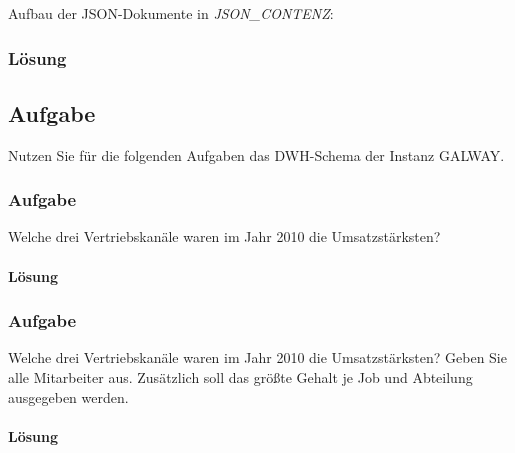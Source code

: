 Aufbau der JSON-Dokumente in \textit{JSON\_CONTENZ}:


\subsubsection*{Lösung}
\label{subsubsec:uebung_12.aufgabe_02.loesung}


\subsection{Aufgabe}
\label{subsec:uebung_12.aufgabe_03}
Nutzen Sie für die folgenden Aufgaben das DWH-Schema der Instanz GALWAY.

\subsubsection{Aufgabe}
\label{subsec:uebung_12.aufgabe_03a}
Welche drei Vertriebskanäle waren im Jahr 2010 die Umsatzstärksten?

\paragraph{Lösung}
\label{subsubsec:uebung_12.aufgabe_03a.loesung}

\subsubsection{Aufgabe}
\label{subsec:uebung_12.aufgabe_03b}
Welche drei Vertriebskanäle waren im Jahr 2010 die Umsatzstärksten?
Geben Sie alle Mitarbeiter aus. Zusätzlich soll das größte Gehalt je Job und Abteilung ausgegeben werden.

\paragraph*{Lösung}
\label{subsubsec:uebung_12.aufgabe_03b.loesung}

